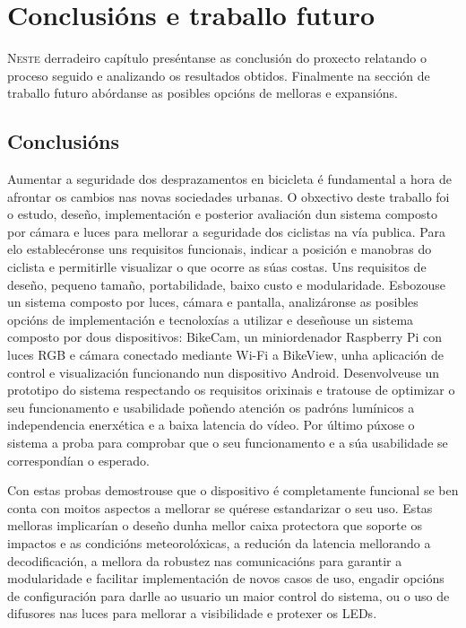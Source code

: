 \chapter{Conclusións e traballo futuro}
\label{chap:conclusions}
\lettrine{N}{este} derradeiro capítulo preséntanse as conclusión do proxecto relatando o proceso seguido e analizando os resultados obtidos. Finalmente na sección de traballo futuro abórdanse as posibles opcións de melloras e expansións.

\section{Conclusións}
Aumentar a seguridade dos desprazamentos en bicicleta é fundamental a hora de afrontar os cambios nas novas sociedades urbanas. O obxectivo deste traballo  foi o estudo, deseño, implementación e posterior avaliación dun sistema composto por cámara e luces para mellorar a seguridade dos ciclistas na vía publica. Para elo establecéronse uns requisitos funcionais, indicar a posición e manobras do ciclista e permitirlle visualizar o que ocorre as súas costas. Uns requisitos de deseño, pequeno tamaño, portabilidade, baixo custo e modularidade. Esbozouse un sistema composto por luces, cámara e pantalla, analizáronse as posibles opcións de implementación e tecnoloxías a utilizar e deseñouse un sistema composto por dous dispositivos: BikeCam, un miniordenador Raspberry Pi con luces RGB e cámara conectado mediante Wi-Fi a BikeView, unha aplicación de control e visualización funcionando nun dispositivo Android. Desenvolveuse un prototipo do sistema respectando os requisitos orixinais e tratouse de optimizar o seu funcionamento e usabilidade poñendo atención os padróns lumínicos a independencia enerxética e a baixa latencia do vídeo. Por último púxose o sistema a proba para comprobar que o seu funcionamento e a súa usabilidade se correspondían o esperado.

Con estas probas demostrouse que o dispositivo é completamente funcional se ben conta con moitos aspectos a mellorar se quérese estandarizar o seu uso. Estas melloras implicarían o deseño dunha mellor caixa protectora que soporte os impactos e as condicións meteorolóxicas, a redución da latencia mellorando a decodificación, a mellora da robustez nas comunicacións para garantir a modularidade e facilitar implementación de novos casos de uso, engadir opcións de configuración para darlle ao usuario un maior control do sistema, ou o uso de difusores nas luces para mellorar a visibilidade e protexer os LEDs.


